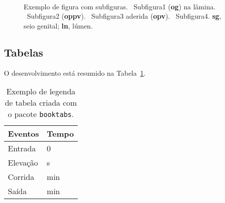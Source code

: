 \begin{figure}[htbp]
  \centering
  \vspace{11pt}
  \\
  \vspace{-18pt}
  \vspace{11pt}
  \caption[Figura com subfiguras]{Exemplo de figura com subfiguras. ~Subfigura1 (\textbf{og}) na lâmina. ~Subfigura2 (\textbf{oppv}). ~Subfigura3 aderida (\textbf{opv}). ~Subfigura4. \textbf{sg}, seio genital; \textbf{ln}, lúmen.}%
  \label{fig:tufo}
\end{figure}

\subsection{Tabelas}\label{cap2:res:tabs}

O desenvolvimento está resumido na Tabela~\ref{tab:exemplo}.

\begin{table}[htbp]
  \caption[Tabela com \texttt{booktabs}]{Exemplo de legenda de tabela criada com o pacote \texttt{booktabs}.}
  \label{tab:exemplo}
  \vspace{1em}
  \centering
  \begin{tabular}{l l}
    \toprule
    Eventos		&	Tempo\\
    \midrule
    Entrada		&	0\\
    Elevação		&	\unit[40]{s}\\
    Corrida		&	\unit[6]{min}\\
    Saída		&	\unit[15]{min}\\
    \bottomrule
  \end{tabular}
\end{table}

